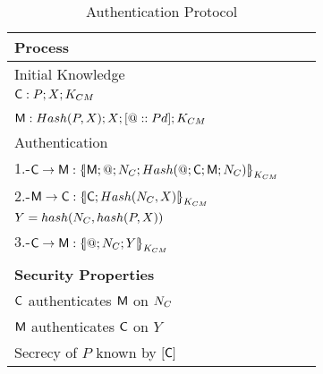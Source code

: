 \begin{table}[htb]
\footnotesize
\begin{center}
\caption{Authentication Protocol}
\label{table:AuthProtocol}
\begin{tabular}{|l|l|l|}
\hline
{\bf Process}                                                                     \\\hline\hline
            Initial Knowledge                                                     \\
            $\textsf{C}:P; X ; K_{CM}$                               \\
            \hspace{5mm}                                                 \\ 
            $\textsf{M}:Hash(P,X); X ;[@::Pd] ; K_{CM}$ \\\hline \hline
            Authentication                                                         \\
            1.-$\Client\rightarrow \Server: \fat{\Server \lnk @ \lnk N_{\client} \lnk 
                                              Hash(@\lnk \Client \lnk \Server \lnk N_\client)}_{K_{\client\serverW}}$  \\ 
            2.-$\Server\rightarrow \Client: \fat{\Client \lnk Hash(N_{\client},X)}_{K_{\client\serverW}}$ \\ 
            \hspace{5mm} $Y=hash(N_{C},hash(P,X))$                          \\              
            3.-$\Client\rightarrow \Server: \fat{@\lnk N_{\client}\lnk Y}_{K_{\client\serverW}}$            \\ \\ \hline  \hline
            \textbf{Security Properties}                        \\
            \hspace{5mm} $\textsf{C}$ authenticates $\textsf{M}$ on $N_{C}$        \\
            \hspace{5mm} $\textsf{M}$ authenticates $\textsf{C}$ on $Y$  \\ 
            \hspace{5mm} Secrecy of $P$ known by $[\textsf{C}]$ \\\hline \hline
\end{tabular}
\end{center}
\end{table}
\normalsize


